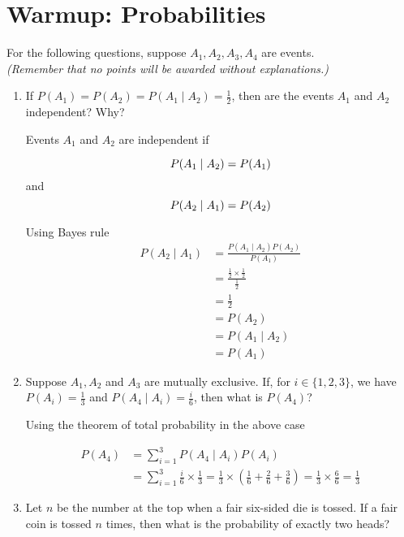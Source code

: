 \section{Warmup: Probabilities}

For the following questions, suppose $A_1, A_2, A_3, A_4$ are
events.\\\textit{(Remember that no points will be awarded without explanations.)}

\begin{enumerate}
\item \relax[2 points] If $P(A_1) = P(A_2) = P(A_1 \mid A_2) = \frac{1}{2}$, then
  are the events $A_1$ and $A_2$ independent? Why?
  
Events $A_1$ and $A_2$ are independent if 
  
$$
P(A_1\mid A_2) = P(A_1)\\
$$
and
$$
P(A_2\mid A_1) = P(A_2)\\
$$

Using Bayes rule
\begin{equation*}
\begin{aligned}
P(A_2\mid A_1) &= \frac{P(A_1\mid A_2)P(A_2)}{P(A_1)} \\
&= \frac{\frac{1}{2}\times \frac{1}{2}}{\frac{1}{2}}\\
&= \frac{1}{2}\\
&=P(A_2)\\
&= P(A_1 \mid A_2)\\
&= P(A_1)
\end{aligned}
\end{equation*}
  
\item \relax[3 points] Suppose $A_1, A_2$ and $A_3$ are mutually
  exclusive. If, for $i \in \{1,2,3\}$, we have $P(A_i) = \frac{1}{3}$
  and $P(A_4 \mid A_i) = \frac{i}{6}$, then what is $P(A_4)$?
  
Using the theorem of total probability in the above case

\begin{equation*}
\begin{aligned}
P(A_4) &= \sum_{i=1}^3 P(A_4 \mid A_i) P(A_i)\\
&= \sum_{i=1}^3 \frac{i}{6} \times \frac{1}{3}
= \frac{1}{3} \times \left ( \frac{1}{6} + \frac{2}{6} + \frac{3}{6} \right )
= \frac{1}{3} \times \frac{6}{6}
= \frac{1}{3} 
\end{aligned}
\end{equation*} 
 
\item \relax[3 points] Let $n$ be the number at the top when a fair
  six-sided die is tossed. If a fair coin is tossed $n$ times, then
  what is the probability of exactly two heads?


\end{enumerate}
